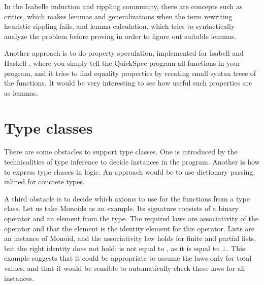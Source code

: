
In the Isabelle induction and rippling community, there are concepts
such as critics, which makes lemmas and generalizations when the term
rewriting heuristic rippling fails, and lemma calculation, which tries
to syntactically analyze the problem before proving in order to figure
out suitable lemmas.

Another approach is to do property speculation, implemented for
Isabell \cite{isacosy} and Haskell \cite{quickspec}, where you simply
tell the QuickSpec program all functions in your program, and it tries
to find equality properties by creating small syntax trees of the
functions. It would be very interesting to see how useful such
properties are as lemmas.



%

%

\section{Type classes}
\label{sec:typeclasses}

There are some obstacles to support type classes. One is introduced by
the technicalities of type inference to decide instances in the
program. Another is how to express type classes in logic. An approach
would be to use dictionary passing, inlined for concrete types.

A third obstacle is to decide which axioms to use for the functions
from a type class. Let us take Monoids as an example. Its signature
consists of a binary operator and an element from the type. The
required laws are associativity of the operator and that the element
is the identity element for this operator. Lists are an instance of
Monoid, and the associativity law holds for finite and partial lists,
but the right identity does not hold: \hs{$\bot$ ++ []} is not equal
to \hs{[]}, as it is equal to $\bot$. This example suggests that it
could be appropriate to assume the laws only for total values, and
that it would be sensible to automatically check these laws for all
instances.

